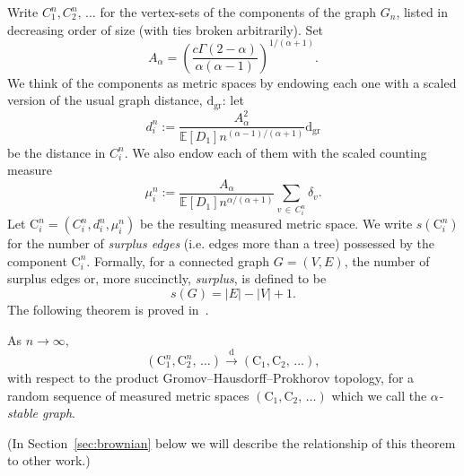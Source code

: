 \documentclass[AHL,Unicode,longabstracts,published]{cedram}
\newcommand{\convdist}{\ensuremath{\overset{\mathrm{d}}{\rightarrow}}}
\newcommand{\gr}{\mathrm{gr}}
\newcommand{\rmd}{\mathrm{d}}
\newcommand{\rmC}{\mathrm{C}}
\newcommand{\bbE}{\mathbb{E}}
\begin{document}
Write $C_1^n, C_2^n,\,\ldots$ for the vertex-sets of the components of the graph $G_n$, listed in decreasing order of size (with ties broken arbitrarily). Set
\begin{equation}\label{A_alpha}
A_{\alpha} =\left(\frac{c \Gamma(2-\alpha)}{\alpha(\alpha-1)}\right)^{1/(\alpha+1)}.
\end{equation}
We think of the components as metric spaces by endowing each one with a scaled version of the usual graph distance, $\rmd_{\gr}$: let
\[
d_i^n := \frac{A_{\alpha}^2}{\bbE[D_1] n^{(\alpha-1)/(\alpha+1)}} \rmd_{\gr}
\]
be the distance in $C_i^n$. We also endow each of them with the scaled counting measure
\[
\mu_i^n := \frac{A_{\alpha}}{\bbE[D_1] n^{\alpha/(\alpha+1)}} \sum_{v\,\in\,C_i^n} \delta_v.
\]
Let $\rmC_i^n = (C_i^n, d_i^n, \mu_i^n)$ be the resulting measured metric space. We write $s(\rmC^n_i)$ for the number of \emph{surplus edges} (i.e. edges more than a tree) possessed by the component $\rmC^n_i$. Formally, for a connected graph $G=(V,E)$, the number of surplus edges or, more succinctly, \emph{surplus}, is defined to be
\[
s(G)=|E|-|V|+1.
\]
The following theorem is proved in~\cite{CKG17+}.

\begin{theo}\label{th:C-K+G}
As $n \to \infty$,
\[
\left(\rmC_1^n, \rmC_2^n,\,\ldots\right) \convdist \left(\rmC_1, \rmC_2,\,\ldots\right),
\]
with respect to the product Gromov--Hausdorff--Prokhorov topology, for a random sequence of measured metric spaces $(\rmC_1, \rmC_2,\,\ldots)$ which we call the \emph{$\alpha$-stable graph}.
\end{theo}

(In Section~\ref{sec:brownian} below we will describe the relationship of this theorem to other work.)
\end{document}
